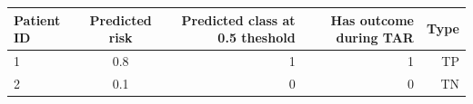 \documentclass[11pt]{book}
\begin{document}
\begin{longtable}[]{@{}lcrrr@{}}
\toprule
\begin{minipage}[b]{0.19\columnwidth}\raggedright\strut
Patient ID\strut
\end{minipage} & \begin{minipage}[b]{0.19\columnwidth}\centering\strut
Predicted risk\strut
\end{minipage} & \begin{minipage}[b]{0.10\columnwidth}\raggedleft\strut
Predicted class at 0.5 theshold\strut
\end{minipage} & \begin{minipage}[b]{0.10\columnwidth}\raggedleft\strut
Has outcome during TAR\strut
\end{minipage} & \begin{minipage}[b]{0.10\columnwidth}\raggedleft\strut
Type\strut
\end{minipage}\tabularnewline
\midrule
\endhead
\begin{minipage}[t]{0.19\columnwidth}\raggedright\strut
1\strut
\end{minipage} & \begin{minipage}[t]{0.19\columnwidth}\centering\strut
0.8\strut
\end{minipage} & \begin{minipage}[t]{0.10\columnwidth}\raggedleft\strut
1\strut
\end{minipage} & \begin{minipage}[t]{0.10\columnwidth}\raggedleft\strut
1\strut
\end{minipage} & \begin{minipage}[t]{0.10\columnwidth}\raggedleft\strut
TP\strut
\end{minipage}\tabularnewline
\begin{minipage}[t]{0.19\columnwidth}\raggedright\strut
2\strut
\end{minipage} & \begin{minipage}[t]{0.19\columnwidth}\centering\strut
0.1\strut
\end{minipage} & \begin{minipage}[t]{0.10\columnwidth}\raggedleft\strut
0\strut
\end{minipage} & \begin{minipage}[t]{0.10\columnwidth}\raggedleft\strut
0\strut
\end{minipage} & \begin{minipage}[t]{0.10\columnwidth}\raggedleft\strut
TN\strut
\end{minipage}\tabularnewline

\end{longtable}
\end{document}
